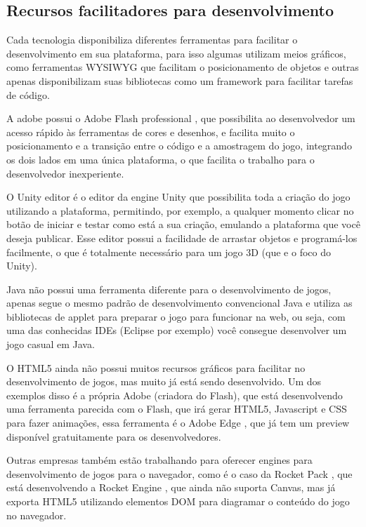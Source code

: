 \subsection{Recursos facilitadores para desenvolvimento}

Cada tecnologia disponibiliza diferentes ferramentas para facilitar o
desenvolvimento em sua plataforma, para isso algumas utilizam meios
gráficos, como ferramentas WYSIWYG que facilitam o posicionamento de
objetos e outras apenas disponibilizam suas bibliotecas como um
framework para facilitar tarefas de código.

A adobe possui o Adobe Flash professional \cite{website:adobeflash},
que possibilita ao desenvolvedor um acesso rápido às ferramentas de cores
e desenhos, e facilita muito o posicionamento e a transição entre o
código e a amostragem do jogo, integrando os dois lados em uma única
plataforma, o que facilita o trabalho para o desenvolvedor
inexperiente.

O Unity editor \cite{website:unity3d} é o editor da engine Unity que possibilita toda a
criação do jogo utilizando a plataforma, permitindo, por exemplo, a
qualquer momento clicar no botão de iniciar e testar como está a sua
criação, emulando a plataforma que você deseja publicar.
Esse editor possui a facilidade de arrastar objetos e programá-los
facilmente, o que é totalmente necessário para um jogo 3D (que e o
foco do Unity).

Java não possui uma ferramenta diferente para o desenvolvimento de
jogos, apenas segue o mesmo padrão de desenvolvimento convencional
Java e utiliza as bibliotecas de applet para preparar o jogo para
funcionar na web, ou seja, com uma das conhecidas IDEs (Eclipse por
exemplo) você consegue desenvolver um jogo casual em Java.

O HTML5 ainda não possui muitos recursos gráficos para facilitar no
desenvolvimento de jogos, mas muito já está sendo desenvolvido. Um dos
exemplos disso é a própria Adobe (criadora do Flash), que está
desenvolvendo uma ferramenta parecida com o Flash, que irá gerar
HTML5, Javascript e CSS para fazer animações, essa ferramenta é o
Adobe Edge \cite{website:adobeedge}, que já tem um preview disponível
gratuitamente para os desenvolvedores.

Outras empresas também estão trabalhando para oferecer engines para
desenvolvimento de jogos para o navegador, como é o caso da Rocket
Pack \cite{website:rocketpack}, que está desenvolvendo a Rocket Engine
\cite{website:rocketengine}, que ainda não suporta Canvas, mas já
exporta HTML5 utilizando elementos DOM para diagramar o conteúdo do
jogo no navegador.
